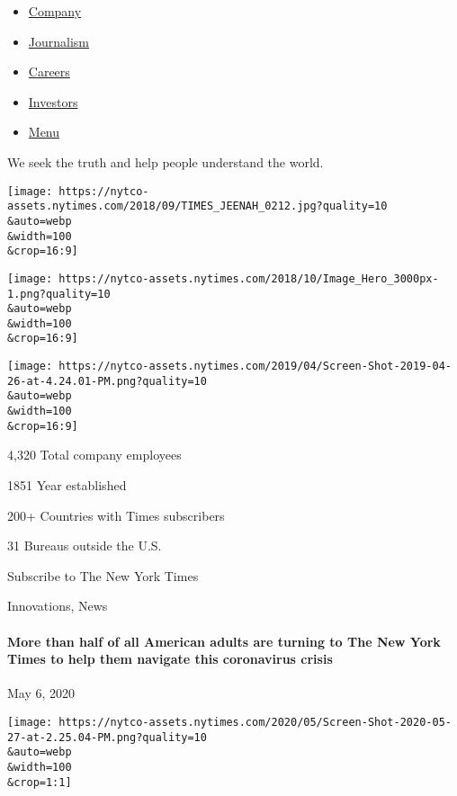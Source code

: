 \begin{itemize}
\tightlist
\item
  \href{https://www.nytco.com/company/}{Company}
\item
  \href{https://www.nytco.com/journalism/}{Journalism}
\item
  \href{https://www.nytco.com/careers/}{Careers}
\item
  \href{https://www.nytco.com/investors/investor-relations/}{Investors}
\item
  \protect\hyperlink{}{Menu}
\end{itemize}

We seek the truth and help people understand the world.

\texttt{[image: https://nytco-assets.nytimes.com/2018/09/TIMES\_JEENAH\_0212.jpg?quality=10\\\&auto=webp\\\&width=100\\\&crop=16:9]}

\texttt{[image: https://nytco-assets.nytimes.com/2018/10/Image\_Hero\_3000px-1.png?quality=10\\\&auto=webp\\\&width=100\\\&crop=16:9]}

\texttt{[image: https://nytco-assets.nytimes.com/2019/04/Screen-Shot-2019-04-26-at-4.24.01-PM.png?quality=10\\\&auto=webp\\\&width=100\\\&crop=16:9]}

4,320 Total company employees

1851 Year established

200+ Countries with Times subscribers

31 Bureaus outside the U.S.

Subscribe to The New York Times

\href{https://www.nytco.com/press/more-than-half-of-all-american-adults-are-turning-to-the-new-york-times-to-help-them-navigate-this-coronavirus-crisis/}{}

 Innovations, News

\hypertarget{more-than-half-of-all-american-adults-are-turning-to-the-new-york-times-to-help-them-navigate-this-coronavirus-crisis}{%
\paragraph{More than half of all American adults are turning to The New
York Times to help them navigate this coronavirus
crisis}\label{more-than-half-of-all-american-adults-are-turning-to-the-new-york-times-to-help-them-navigate-this-coronavirus-crisis}}

May 6, 2020

\texttt{[image: https://nytco-assets.nytimes.com/2020/05/Screen-Shot-2020-05-27-at-2.25.04-PM.png?quality=10\\\&auto=webp\\\&width=100\\\&crop=1:1]}

